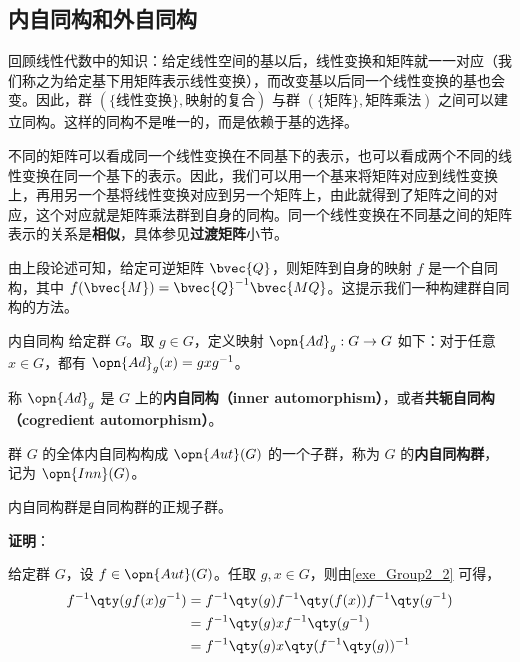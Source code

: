 \subsection{内自同构和外自同构}



回顾线性代数中的知识：给定线性空间的基以后，线性变换和矩阵就一一对应（我们称之为给定基下用矩阵表示线性变换），而改变基以后同一个线性变换的基也会变。因此，群 $(\{\text{线性变换}\}, \text{映射的复合})$ 与群 $(\{\text{矩阵}\}, \text{矩阵乘法})$ 之间可以建立同构。这样的同构不是唯一的，而是依赖于基的选择。

不同的矩阵可以看成同一个线性变换在不同基下的表示，也可以看成两个不同的线性变换在同一个基下的表示。因此，我们可以用一个基来将矩阵对应到线性变换上，再用另一个基将线性变换对应到另一个矩阵上，由此就得到了矩阵之间的对应，这个对应就是矩阵乘法群到自身的同构。同一个线性变换在不同基之间的矩阵表示的关系是\textbf{相似}，具体参见\textbf{过渡矩阵}小节。

由上段论述可知，给定可逆矩阵 $\bvec{Q}$，则矩阵到自身的映射 $f$ 是一个自同构，其中 $f(\bvec{M})=\bvec{Q}^{-1}\bvec{MQ}$。这提示我们一种构建群自同构的方法。

\begin{definition}{内自同构}
给定群 $G$。取 $g\in G$，定义映射 $\opn{Ad}_g:G\to G$ 如下：对于任意 $x\in G$，都有 $\opn{Ad}_g(x)=gxg^{-1}$。

称 $\opn{Ad}_g$ 是 $G$ 上的\textbf{内自同构（inner automorphism）}，或者\textbf{共轭自同构（cogredient automorphism）}。


群 $G$ 的全体内自同构构成 $\opn{Aut}(G)$ 的一个子群，称为 $G$ 的\textbf{内自同构群}， 记为 $\opn{Inn}(G)$。

\end{definition}

\begin{theorem}{}\label{the_Group2_1}
内自同构群是自同构群的正规子群。
\end{theorem}

\textbf{证明}：

给定群 $G$，设 $f\in \opn{Aut}(G)$。任取 $g, x\in G$，则由\autoref{exe_Group2_2} 可得，
\begin{equation}\label{eq_Group2_1}
\begin{aligned}
f^{-1}\qty(gf(x)g^{-1})&=f^{-1}\qty(g)f^{-1}\qty(f(x))f^{-1}\qty(g^{-1})\\
&=f^{-1}\qty(g)xf^{-1}\qty(g^{-1})\\
&=f^{-1}\qty(g)x\qty(f^{-1}\qty(g))^{-1}
\end{aligned}
\end{equation}

